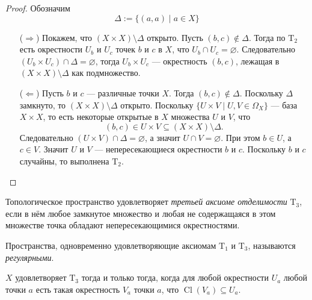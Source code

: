 \documentclass[12pt,a4paper]{article}
\DeclareMathOperator{\Cl}{Cl}
\newcommand{\T}{\ensuremath{\mathrm{T}}\xspace}
\begin{document}
    \begin{proof}
        Обозначим
        \[\Delta := \{(a, a) \mid a \in X\}\]
        \begin{itemize}
            \item[($\Rightarrow$)] Покажем, что $(X \times X) \setminus \Delta$ открыто. Пусть $(b, c) \notin \Delta$. Тогда по $\T_2$ есть окрестности $U_b$ и $U_c$ точек $b$ и $c$ в $X$, что $U_b \cap U_c = \varnothing$. Следовательно $(U_b \times U_c) \cap \Delta = \varnothing$, тогда $U_b \times U_c$ --- окрестность $(b, c)$, лежащая в $(X \times X) \setminus \Delta$ как подмножество.

            \item[($\Leftarrow$)] Пусть $b$ и $c$ --- различные точки $X$. Тогда $(b, c) \notin \Delta$. Поскольку $\Delta$ замкнуто, то $(X \times X) \setminus \Delta$ открыто. Поскольку $\{U \times V \mid U, V \in \Omega_X\}$ --- база $X \times X$, то есть некоторые открытые в $X$ множества $U$ и $V$, что
            \[(b, c) \in U \times V \subseteq (X \times X) \setminus \Delta.\]
            Следовательно $(U \times V) \cap \Delta = \varnothing$, а значит $U \cap V = \varnothing$. При этом $b \in U$, а $c \in V$. Значит $U$ и $V$ --- непересекающиеся окрестности $b$ и $c$. Поскольку $b$ и $c$ случайны, то выполнена $\T_2$. 
        \end{itemize}
    \end{proof}

    \begin{definition}
        Топологическое пространство удовлетворяет \emph{третьей аксиоме отделимости} $\T_3$, если в нём любое замкнутое множество и любая не содержащаяся в этом множестве точка обладают непересекающимися окрестностями.

        Пространства, одновременно удовлетворяющие аксиомам $\T_1$ и $\T_3$, называются \emph{регулярными}.
    \end{definition}

    \begin{theorem}
        $X$ удовлетворяет $\T_3$ тогда и только тогда, когда для любой окрестности $U_a$ любой точки $a$ есть такая окрестность $V_a$ точки $a$, что $\Cl(V_a) \subseteq U_a$.
    \end{theorem}
\end{document}
